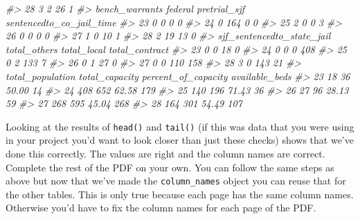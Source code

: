 \documentclass[
  12pt,
]{book}
\newenvironment{Shaded}{\begin{snugshade}}{\end{snugshade}}
\newcommand{\CommentTok}[1]{\textcolor[rgb]{0.37,0.37,0.37}{\textit{#1}}}
\begin{document}
\begin{Shaded}
\begin{Highlighting}[]
\CommentTok{\#\textgreater{} 28                3                          2            26         1}
\CommentTok{\#\textgreater{}    bench\_warrants federal pretrial\_sjf sentencedto\_co\_jail\_time}
\CommentTok{\#\textgreater{} 23              0       0            0                        0}
\CommentTok{\#\textgreater{} 24              0     164            0                        0}
\CommentTok{\#\textgreater{} 25              2       0            0                        3}
\CommentTok{\#\textgreater{} 26              0       0            0                        0}
\CommentTok{\#\textgreater{} 27              1       0           10                        1}
\CommentTok{\#\textgreater{} 28              2      19           13                        0}
\CommentTok{\#\textgreater{}    sjf\_sentencedto\_state\_jail total\_others total\_local total\_contract}
\CommentTok{\#\textgreater{} 23                          0            0          18              0}
\CommentTok{\#\textgreater{} 24                          0            0           0            408}
\CommentTok{\#\textgreater{} 25                          0            2         133              7}
\CommentTok{\#\textgreater{} 26                          0            1          27              0}
\CommentTok{\#\textgreater{} 27                          0            0         110            158}
\CommentTok{\#\textgreater{} 28                          3            0         143             21}
\CommentTok{\#\textgreater{}    total\_population total\_capacity percent\_of\_capacity available\_beds}
\CommentTok{\#\textgreater{} 23               18             36               50.00             14}
\CommentTok{\#\textgreater{} 24              408            652               62.58            179}
\CommentTok{\#\textgreater{} 25              140            196               71.43             36}
\CommentTok{\#\textgreater{} 26               27             96               28.13             59}
\CommentTok{\#\textgreater{} 27              268            595               45.04            268}
\CommentTok{\#\textgreater{} 28              164            301               54.49            107}
\end{Highlighting}
\end{Shaded}

Looking at the results of \texttt{head()} and \texttt{tail()} (if this was data that you were using in your project you'd want to look closer than just these checks) shows that we've done this correctly. The values are right and the column names are correct. Complete the rest of the PDF on your own. You can follow the same steps as above but now that we've made the \texttt{column\_names} object you can reuse that for the other tables. This is only true because each page has the same column names. Otherwise you'd have to fix the column names for each page of the PDF.
\end{document}
